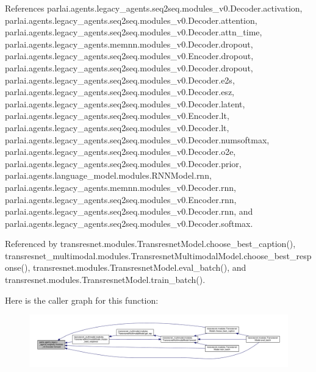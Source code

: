 References parlai.\+agents.\+legacy\+\_\+agents.\+seq2seq.\+modules\+\_\+v0.\+Decoder.\+activation, parlai.\+agents.\+legacy\+\_\+agents.\+seq2seq.\+modules\+\_\+v0.\+Decoder.\+attention, parlai.\+agents.\+legacy\+\_\+agents.\+seq2seq.\+modules\+\_\+v0.\+Decoder.\+attn\+\_\+time, parlai.\+agents.\+legacy\+\_\+agents.\+memnn.\+modules\+\_\+v0.\+Decoder.\+dropout, parlai.\+agents.\+legacy\+\_\+agents.\+seq2seq.\+modules\+\_\+v0.\+Encoder.\+dropout, parlai.\+agents.\+legacy\+\_\+agents.\+seq2seq.\+modules\+\_\+v0.\+Decoder.\+dropout, parlai.\+agents.\+legacy\+\_\+agents.\+seq2seq.\+modules\+\_\+v0.\+Decoder.\+e2s, parlai.\+agents.\+legacy\+\_\+agents.\+seq2seq.\+modules\+\_\+v0.\+Decoder.\+esz, parlai.\+agents.\+legacy\+\_\+agents.\+seq2seq.\+modules\+\_\+v0.\+Decoder.\+latent, parlai.\+agents.\+legacy\+\_\+agents.\+seq2seq.\+modules\+\_\+v0.\+Encoder.\+lt, parlai.\+agents.\+legacy\+\_\+agents.\+seq2seq.\+modules\+\_\+v0.\+Decoder.\+lt, parlai.\+agents.\+legacy\+\_\+agents.\+seq2seq.\+modules\+\_\+v0.\+Decoder.\+numsoftmax, parlai.\+agents.\+legacy\+\_\+agents.\+seq2seq.\+modules\+\_\+v0.\+Decoder.\+o2e, parlai.\+agents.\+legacy\+\_\+agents.\+seq2seq.\+modules\+\_\+v0.\+Decoder.\+prior, parlai.\+agents.\+language\+\_\+model.\+modules.\+R\+N\+N\+Model.\+rnn, parlai.\+agents.\+legacy\+\_\+agents.\+memnn.\+modules\+\_\+v0.\+Decoder.\+rnn, parlai.\+agents.\+legacy\+\_\+agents.\+seq2seq.\+modules\+\_\+v0.\+Encoder.\+rnn, parlai.\+agents.\+legacy\+\_\+agents.\+seq2seq.\+modules\+\_\+v0.\+Decoder.\+rnn, and parlai.\+agents.\+legacy\+\_\+agents.\+seq2seq.\+modules\+\_\+v0.\+Decoder.\+softmax.



Referenced by transresnet.\+modules.\+Transresnet\+Model.\+choose\+\_\+best\+\_\+caption(), transresnet\+\_\+multimodal.\+modules.\+Transresnet\+Multimodal\+Model.\+choose\+\_\+best\+\_\+response(), transresnet.\+modules.\+Transresnet\+Model.\+eval\+\_\+batch(), and transresnet.\+modules.\+Transresnet\+Model.\+train\+\_\+batch().

Here is the caller graph for this function\+:
\nopagebreak
\begin{figure}[H]
\begin{center}
\leavevmode
\includegraphics[width=350pt]{classparlai_1_1agents_1_1legacy__agents_1_1seq2seq_1_1modules__v0_1_1Decoder_af2cfe1b8b2780f80893db77fa4b75aea_icgraph}
\end{center}
\end{figure}


